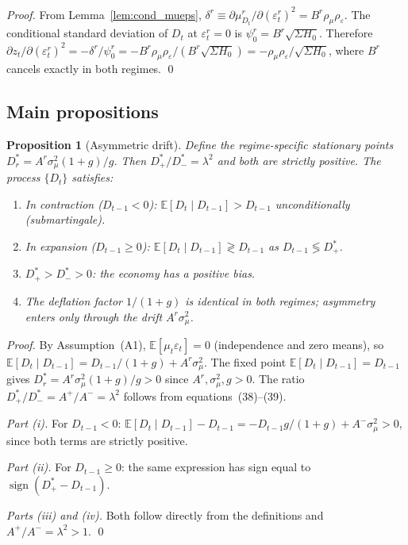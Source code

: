 \documentclass[12pt,a4paper]{article}
\newtheorem{proposition}[theorem]{Proposition}
\theoremstyle{definition}
\begin{document}
\begin{proof}
From Lemma~\ref{lem:cond_mueps}, $\delta^r \equiv \partial
\mu^r_{D_t}/\partial(\varepsilon^r_t)^2 = B^r\rho_\mu\rho_\varepsilon$.
The conditional standard deviation of $D_t$ at $\varepsilon^r_t = 0$
is $\psi^r_0 = B^r\sqrt{\Sigma H_0}$. Therefore
$\partial z_t/\partial(\varepsilon^r_t)^2 = -\delta^r/\psi^r_0 =
-B^r\rho_\mu\rho_\varepsilon/(B^r\sqrt{\Sigma H_0}) =
-\rho_\mu\rho_\varepsilon/\sqrt{\Sigma H_0}$,
where $B^r$ cancels exactly in both regimes.
\qed
\end{proof}

\subsection{Main propositions}

\begin{proposition}[Asymmetric drift]
\label{prop:asym_drift}
Define the regime-specific stationary points $D^*_r = A^r\sigma^2_\mu(1+g)/g$.
Then $D^*_+/D^*_- = \lambda^2$ and both are strictly positive. The
process $\{D_t\}$ satisfies:
\begin{enumerate}
  \item[(i)] In contraction ($D_{t-1}<0$): $\mathbb{E}[D_t \mid
    D_{t-1}] > D_{t-1}$ unconditionally (submartingale).
  \item[(ii)] In expansion ($D_{t-1}\geq0$): $\mathbb{E}[D_t \mid
    D_{t-1}] \gtrless D_{t-1}$ as $D_{t-1} \lessgtr D^*_+$.
  \item[(iii)] $D^*_+ > D^*_- > 0$: the economy has a positive bias.
  \item[(iv)] The deflation factor $1/(1+g)$ is identical in both
    regimes; asymmetry enters only through the drift $A^r\sigma^2_\mu$.
\end{enumerate}
\end{proposition}

\begin{proof}
By Assumption~(A1), $\mathbb{E}[\mu_t\varepsilon_t] = 0$ (independence
and zero means), so $\mathbb{E}[D_t \mid D_{t-1}] = D_{t-1}/(1+g) +
A^r\sigma^2_\mu$. The fixed point $\mathbb{E}[D_t \mid D_{t-1}] = D_{t-1}$
gives $D^*_r = A^r\sigma^2_\mu(1+g)/g > 0$ since $A^r, \sigma^2_\mu,
g > 0$. The ratio $D^*_+/D^*_- = A^+/A^- = \lambda^2$ follows from
equations~(38)--(39).

\textit{Part (i).} For $D_{t-1} < 0$: $\mathbb{E}[D_t \mid D_{t-1}]
- D_{t-1} = -D_{t-1}g/(1+g) + A^-\sigma^2_\mu > 0$, since both
terms are strictly positive.

\textit{Part (ii).} For $D_{t-1} \geq 0$: the same expression has sign
equal to $\operatorname{sign}(D^*_+ - D_{t-1})$.

\textit{Parts (iii) and (iv).} Both follow directly from the definitions
and $A^+/A^- = \lambda^2 > 1$.
\qed
\end{proof}
\end{document}
